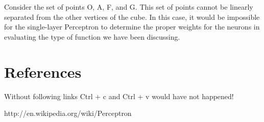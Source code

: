 Consider the set of points O, A, F, and G. This set of points cannot be linearly
separated from the other vertices of the cube. In this case, it would be
impossible for the single-layer Perceptron to determine the proper weights for
the neurons in evaluating the type of function we have been discussing.
\chapter{References}
Without following links Ctrl + c and Ctrl + v would have not happened!

http://en.wikipedia.org/wiki/Perceptron

